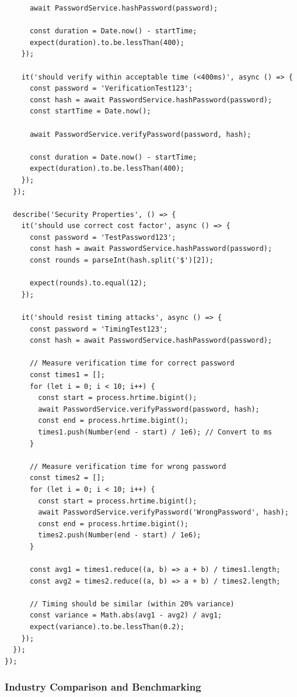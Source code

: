\documentclass[12pt,a4paper]{article}
\begin{document}
\begin{tcolorbox}[colback=primaryblue!5, colframe=primaryblue, boxrule=1pt, arc=3pt, left=10pt, right=10pt, top=8pt, bottom=8pt]
\begin{verbatim}
      await PasswordService.hashPassword(password);
      
      const duration = Date.now() - startTime;
      expect(duration).to.be.lessThan(400);
    });
    
    it('should verify within acceptable time (<400ms)', async () => {
      const password = 'VerificationTest123';
      const hash = await PasswordService.hashPassword(password);
      const startTime = Date.now();
      
      await PasswordService.verifyPassword(password, hash);
      
      const duration = Date.now() - startTime;
      expect(duration).to.be.lessThan(400);
    });
  });
  
  describe('Security Properties', () => {
    it('should use correct cost factor', async () => {
      const password = 'TestPassword123';
      const hash = await PasswordService.hashPassword(password);
      const rounds = parseInt(hash.split('$')[2]);
      
      expect(rounds).to.equal(12);
    });
    
    it('should resist timing attacks', async () => {
      const password = 'TimingTest123';
      const hash = await PasswordService.hashPassword(password);
      
      // Measure verification time for correct password
      const times1 = [];
      for (let i = 0; i < 10; i++) {
        const start = process.hrtime.bigint();
        await PasswordService.verifyPassword(password, hash);
        const end = process.hrtime.bigint();
        times1.push(Number(end - start) / 1e6); // Convert to ms
      }
      
      // Measure verification time for wrong password
      const times2 = [];
      for (let i = 0; i < 10; i++) {
        const start = process.hrtime.bigint();
        await PasswordService.verifyPassword('WrongPassword', hash);
        const end = process.hrtime.bigint();
        times2.push(Number(end - start) / 1e6);
      }
      
      const avg1 = times1.reduce((a, b) => a + b) / times1.length;
      const avg2 = times2.reduce((a, b) => a + b) / times2.length;
      
      // Timing should be similar (within 20% variance)
      const variance = Math.abs(avg1 - avg2) / avg1;
      expect(variance).to.be.lessThan(0.2);
    });
  });
});
\end{verbatim}

\subsubsection{Industry Comparison and Benchmarking}


\end{tcolorbox}
\end{document}
